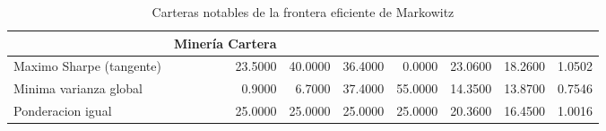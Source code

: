 \begin{table}
\caption{Carteras notables de la frontera eficiente de Markowitz}
\label{tab:tabla8_frontera_carteras}
\begin{tabular}{lrrrrrrr}
\toprule
 & Minería %
Cartera &  &  &  &  &  &  &  \\
\midrule
Maximo Sharpe (tangente) & 23.5000 & 40.0000 & 36.4000 & 0.0000 & 23.0600 & 18.2600 & 1.0502 \\
Minima varianza global & 0.9000 & 6.7000 & 37.4000 & 55.0000 & 14.3500 & 13.8700 & 0.7546 \\
Ponderacion igual & 25.0000 & 25.0000 & 25.0000 & 25.0000 & 20.3600 & 16.4500 & 1.0016 \\
\bottomrule
\end{tabular}
\end{table}
